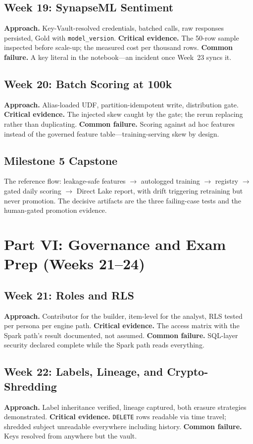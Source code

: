 \subsection{Week 19: SynapseML Sentiment}
\textbf{Approach.} Key-Vault-resolved credentials, batched calls, raw responses persisted, Gold
with \texttt{model\_version}. \textbf{Critical evidence.} The 50-row sample inspected before
scale-up; the measured cost per thousand rows. \textbf{Common failure.} A key literal in the
notebook---an incident once Week~23 syncs it.

\subsection{Week 20: Batch Scoring at 100k}
\textbf{Approach.} Alias-loaded UDF, partition-idempotent write, distribution gate.
\textbf{Critical evidence.} The injected skew caught by the gate; the rerun replacing rather than
duplicating. \textbf{Common failure.} Scoring against ad hoc features instead of the governed
feature table---training-serving skew by design.

\subsection{Milestone 5 Capstone}
The reference flow: leakage-safe features $\rightarrow$ autologged training $\rightarrow$ registry
$\rightarrow$ gated daily scoring $\rightarrow$ Direct Lake report, with drift triggering retraining
but never promotion. The decisive artifacts are the three failing-case tests and the
human-gated promotion evidence.

\section{Part VI: Governance and Exam Prep (Weeks 21--24)}
\subsection{Week 21: Roles and RLS}
\textbf{Approach.} Contributor for the builder, item-level for the analyst, RLS tested per
persona per engine path. \textbf{Critical evidence.} The access matrix with the Spark path's
result documented, not assumed. \textbf{Common failure.} SQL-layer security declared complete
while the Spark path reads everything.

\subsection{Week 22: Labels, Lineage, and Crypto-Shredding}
\textbf{Approach.} Label inheritance verified, lineage captured, both erasure strategies
demonstrated. \textbf{Critical evidence.} \texttt{DELETE} rows readable via time travel; shredded
subject unreadable everywhere including history. \textbf{Common failure.} Keys resolved from
anywhere but the vault.

